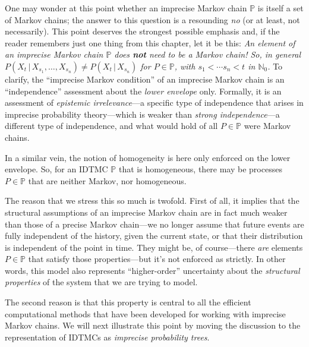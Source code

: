 \documentclass[graybox]{svmult}
\newcommand{\nats}{\mathbb{N}}
\newcommand{\natswith}{\nats_{0}}
\begin{document}
One may wonder at this point whether an imprecise Markov chain $\mathbb{P}$ is itself a set of Markov chains; the answer to this question is a resounding \emph{no} (or at least, not necessarily). This point deserves the strongest possible emphasis and, if the reader remembers just one thing from this chapter, let it be this:
\quad\newline\newline
\noindent \emph{An element of an imprecise Markov chain $\mathbb{P}$ does {\bf not} need to be a Markov chain! So, in general $P(X_t\,\vert\,X_{s_1},\ldots,X_{s_n})\neq P(X_t\,\vert\,X_{s_n})$ for $P\in\mathbb{P}$, with $s_1<\cdots s_n<t$ in $\natswith$.}
\quad\newline\newline
To clarify, the ``imprecise Markov condition'' of an imprecise Markov chain is an ``independence'' assessment about the \emph{lower envelope} only. Formally, it is an assessment of \emph{epistemic irrelevance}---a specific type of independence that arises in imprecise probability theory---which is weaker than \emph{strong independence}---a different type of independence, and what would hold of all $P\in\mathbb{P}$ were Markov chains.

In a similar vein, the notion of homogeneity is here only enforced on the lower envelope. So, for an IDTMC $\mathbb{P}$ that is homogeneous, there may be processes $P\in\mathbb{P}$ that are neither Markov, nor homogeneous.

The reason that we stress this so much is twofold. First of all, it implies that the structural assumptions of an imprecise Markov chain are in fact much weaker than those of a precise Markov chain---we no longer assume that future events are fully independent of the history, given the current state, or that their distribution is independent of the point in time. They might be, of course---there \emph{are} elements $P\in\mathbb{P}$ that satisfy those properties---but it's not enforced as strictly. In other words, this model also represents ``higher-order'' uncertainty about the \emph{structural properties} of the system that we are trying to model.

The second reason is that this property is central to all the efficient computational methods that have been developed for working with imprecise Markov chains. We will next illustrate this point by moving the discussion to the representation of IDTMCs as \emph{imprecise probability trees}.

\end{document}
